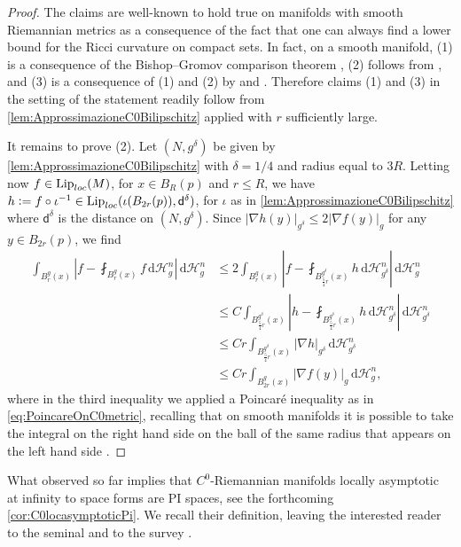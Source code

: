 \documentclass[a4paper,12pt,reqno]{amsart}
\numberwithin{equation}{section}
\theoremstyle{plain}
\theoremstyle{definition}
\theoremstyle{remark}
\newcommand{\eqdef}{\ensuremath{\vcentcolon=}}
\DeclareMathOperator{\Lip}{Lip}
\newcommand{\dist}{\mathsf{d}}
\newcommand{\vol}{\mathcal{H}^n}
\newcommand{\de}{\ensuremath{\,\mathrm d}} %
\begin{document}
{\begin{proof}
The claims are well-known to hold true on manifolds with smooth Riemannian metrics as a consequence of the fact that one can always find a lower bound for the Ricci curvature on compact sets. In fact, on a smooth manifold, (1) is a consequence of the Bishop--Gromov comparison theorem \cite[Lemma 7.1.4]{PetersenBook}, (2) follows from \cite{Buser, RajalaPoincare}, and (3) is a consequence of (1) and (2) by \cite[Theorem 9.7]{HajlaszKoskela} and \cite[Theorem 4.3, Remark 4.4]{Ambrosio02}. Therefore claims (1) and (3) in the setting of the statement readily follow from \cref{lem:ApprossimazioneC0Bilipschitz} applied with $r$ sufficiently large.

It remains to prove (2). Let $(N, g^\delta)$ be given by \cref{lem:ApprossimazioneC0Bilipschitz} with $\delta=1/4$ and radius equal to $3R$. Letting now $f \in \Lip_{\rm loc}(M)$, for $x \in B_R(p)$ and $r \le R$, we have $h\eqdef f \circ \iota^{-1} \in \Lip_{\rm loc}(\iota(B_{2r}(p)), \dist^\delta)$, for $\iota$ as in \cref{lem:ApprossimazioneC0Bilipschitz} where $\dist^\delta$ is the distance on $(N, g^\delta)$. Since $|\nabla h(y)|_{g^\delta} \le 2 |\nabla f (y)|_g$ for any $y \in B_{2r}(p)$, we find
\[
\begin{split}
    \int_{B_r^g(x)}\left|f-\fint_{B_r^g(x)}f\de\vol_g\right|\de\vol_g
    & \le 2 \int_{B_r^g(x)}\left|f-\fint_{B_{\frac54 r}^{g^\delta}(x)}h\de\vol_{g^\delta}\right|\de\vol_g \\
    &\le C \int_{B_{\frac54 r}^{g^\delta}(x)}\left|h-\fint_{B_{\frac54 r}^{g^\delta}(x)}h\de\vol_{g^\delta}\right|\de\vol_{g^\delta} \\
    &\le C r \int_{B_{\frac54 r}^{g^\delta}(x)} |\nabla h |_{g^\delta} \de\vol_{g^\delta}\\
    &\le C r \int_{B^g_{2r}(x)}  |\nabla f (y)|_g \de \vol_g,
\end{split}
\]
where in the third inequality we applied a Poincaré inequality as in \eqref{eq:PoincareOnC0metric}, recalling that on smooth manifolds it is possible to take the integral on the right hand side on the ball of the same radius that appears on the left hand side \cite[Corollary 5.3.5]{SaloffCosteBook}.
\end{proof}

What observed so far implies that $C^0$-Riemannian manifolds locally asymptotic at infinity to space forms are PI spaces, see the forthcoming \cref{cor:C0locasymptoticPi}. We recall their definition, leaving the interested reader to the seminal \cite{HajlaszKoskela, Cheeger00} and to the survey \cite{KleinerMackay}.

}
\end{document}
